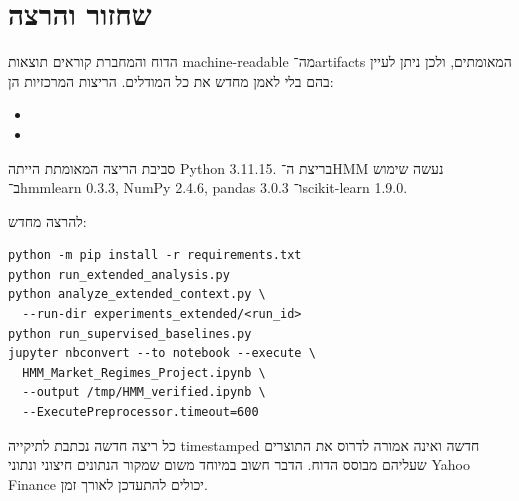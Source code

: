 \appendix
\section{שחזור והרצה}

הדוח והמחברת קוראים תוצאות machine-readable מה־artifacts המאומתים, ולכן ניתן לעיין בהם בלי לאמן מחדש את כל המודלים. הריצות המרכזיות הן:

\begin{itemize}
    \item {}
    \item {}
\end{itemize}

סביבת הריצה המאומתת הייתה Python 3.11.15. בריצת ה־HMM נעשה שימוש ב־hmmlearn 0.3.3, NumPy 2.4.6, pandas 3.0.3 ו־scikit-learn 1.9.0.

להרצה מחדש:

\begin{english}
\begin{verbatim}
python -m pip install -r requirements.txt
python run_extended_analysis.py
python analyze_extended_context.py \
  --run-dir experiments_extended/<run_id>
python run_supervised_baselines.py
jupyter nbconvert --to notebook --execute \
  HMM_Market_Regimes_Project.ipynb \
  --output /tmp/HMM_verified.ipynb \
  --ExecutePreprocessor.timeout=600
\end{verbatim}
\end{english}

כל ריצה חדשה נכתבת לתיקייה timestamped חדשה ואינה אמורה לדרוס את התוצרים שעליהם מבוסס הדוח. הדבר חשוב במיוחד משום שמקור הנתונים חיצוני ונתוני Yahoo Finance יכולים להתעדכן לאורך זמן.
